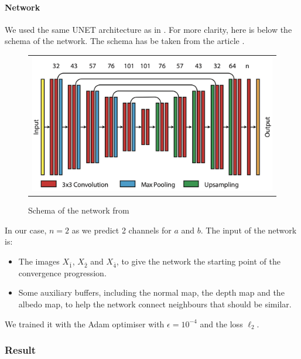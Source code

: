 \documentclass{classeENS}
\begin{document}
\paragraph*{Network} We used the same UNET architecture as in \cite{kuznetsov2018deep}. For more clarity, 
here is below the schema of the network. The schema has be taken from the article 
\cite{kuznetsov2018deep}.
\begin{figure}[H]
    \centering
    \caption{Schema of the network from \cite{kuznetsov2018deep}}
    \begin{tabular}{c}
    \includegraphics[width=120mm]{image/network.png}
    \end{tabular}
\end{figure}
In our case, $n=2$ as we predict 2 channels for $a$ and $b$. The input of the network
is:
\begin{itemize}
    \item The images $X_{\bar 1}$, $X_{\bar 2}$ and $X_{\bar 4}$, to give the network the starting point 
    of the convergence progression.
    \item Some auxiliary buffers, including the normal map, the depth map and the albedo map, to help 
    the network connect neighbours that should be similar.
\end{itemize}

We trained it with the Adam optimiser \cite{kingma2017adam} 
with $\epsilon=10^{-4}$ and the loss $\ell_2$.

\subsubsection{Result}
\end{document}
